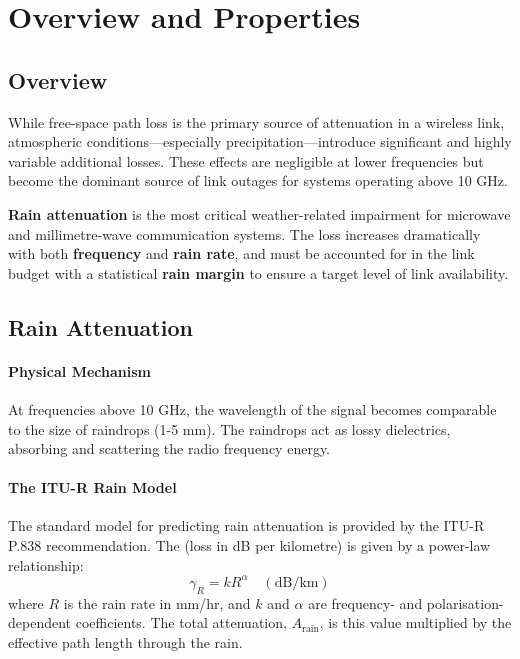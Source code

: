 \section{Overview and Properties}

\subsection{Overview}

While free-space path loss is the primary source of attenuation in a wireless link, atmospheric conditions—especially precipitation—introduce significant and highly variable additional losses. These effects are negligible at lower frequencies but become the dominant source of link outages for systems operating above 10 GHz.

\begin{keyconcept}
    \textbf{Rain attenuation} is the most critical weather-related impairment for microwave and millimetre-wave communication systems. The loss increases dramatically with both \textbf{frequency} and \textbf{rain rate}, and must be accounted for in the link budget with a statistical \textbf{rain margin} to ensure a target level of link availability.
\end{keyconcept}


\subsection{Rain Attenuation}

\paragraph{Physical Mechanism}
At frequencies above 10 GHz, the wavelength of the signal becomes comparable to the size of raindrops (1-5 mm). The raindrops act as lossy dielectrics, absorbing and scattering the radio frequency energy.

\paragraph{The ITU-R Rain Model}
The standard model for predicting rain attenuation is provided by the ITU-R P.838 recommendation. The  (loss in dB per kilometre) is given by a power-law relationship:
\begin{equation}
    \gamma_R = k R^{\alpha} \quad (\text{dB/km})
\end{equation}
where $R$ is the rain rate in mm/hr, and $k$ and $\alpha$ are frequency- and polarisation-dependent coefficients. The total attenuation, $A_{\text{rain}}$, is this value multiplied by the effective path length through the rain.

